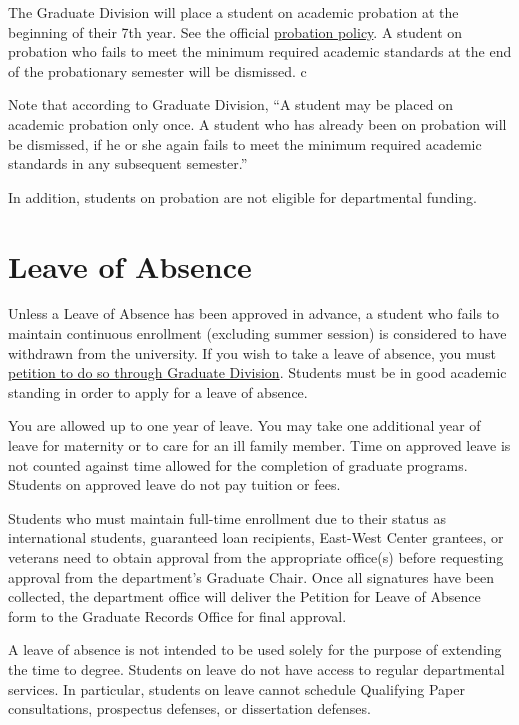 \documentclass[
]{book}
\begin{document}
The Graduate Division will place a student on academic probation at the beginning of their 7th year. See the official \href{http://manoa.hawaii.edu/graduate/content/disciplinary-actions}{probation policy}. A student on probation who fails to meet the minimum required academic standards at the end of the probationary semester will be dismissed. c

Note that according to Graduate Division, ``A student may be placed on academic probation only once. A student who has already been on probation will be dismissed, if he or she again fails to meet the minimum required academic standards in any subsequent semester.''

In addition, students on probation are not eligible for departmental funding.

\hypertarget{leave-of-absence}{%
\section{Leave of Absence}\label{leave-of-absence}}

Unless a Leave of Absence has been approved in advance, a student who fails to maintain continuous enrollment (excluding summer session) is considered to have withdrawn from the university. If you wish to take a leave of absence, you must \href{https://manoa.hawaii.edu/graduate/leave-of-absence/}{petition to do so through Graduate Division}. Students must be in good academic standing in order to apply for a leave of absence.

You are allowed up to one year of leave. You may take one additional year of leave for maternity or to care for an ill family member. Time on approved leave is not counted against time allowed for the completion of graduate programs. Students on approved leave do not pay tuition or fees.

Students who must maintain full-time enrollment due to their status as international students, guaranteed loan recipients, East-West Center grantees, or veterans need to obtain approval from the appropriate office(s) before requesting approval from the department's Graduate Chair. Once all signatures have been collected, the department office will deliver the Petition for Leave of Absence form to the Graduate Records Office for final approval.

A leave of absence is not intended to be used solely for the purpose of extending the time to degree. Students on leave do not have access to regular departmental services. In particular, students on leave cannot schedule Qualifying Paper consultations, prospectus defenses, or dissertation defenses.
\end{document}
